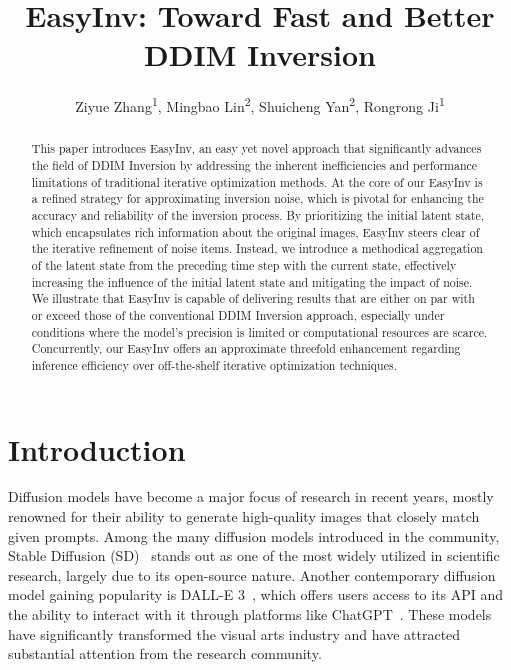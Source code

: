 \documentclass[letterpaper]{article} \usepackage{aaai25}  \usepackage{times}  \usepackage{helvet}  \usepackage{courier}  \usepackage[hyphens]{url}  \usepackage{graphicx} \urlstyle{rm} \def\UrlFont{\rm}  \usepackage{natbib}  \usepackage{caption} \frenchspacing  \setlength{\pdfpagewidth}{8.5in} \setlength{\pdfpageheight}{11in} \usepackage{algorithm}
\begin{document}
\title{EasyInv: Toward Fast and Better DDIM Inversion}
\author {
    Ziyue Zhang\textsuperscript{\rm 1},
    Mingbao Lin\textsuperscript{\rm 2},
    Shuicheng Yan\textsuperscript{\rm 2},
    Rongrong Ji\textsuperscript{\rm 1}
}

\maketitle

\begin{abstract}
This paper introduces EasyInv, an easy yet novel approach that significantly advances the field of DDIM Inversion by addressing the inherent inefficiencies and performance limitations of traditional iterative optimization methods.
At the core of our EasyInv is a refined strategy for approximating inversion noise, which is pivotal for enhancing the accuracy and reliability of the inversion process.
By prioritizing the initial latent state, which encapsulates rich information about the original images, EasyInv steers clear of the iterative refinement of noise items. 
Instead, we introduce a methodical aggregation of the latent state from the preceding time step with the current state, effectively increasing the influence of the initial latent state and mitigating the impact of noise.
We illustrate that EasyInv is capable of delivering results that are either on par with or exceed those of the conventional DDIM Inversion approach, especially under conditions where the model's precision is limited or computational resources are scarce. Concurrently, our EasyInv offers an approximate threefold enhancement regarding inference efficiency over off-the-shelf iterative optimization techniques.
\end{abstract}



\section{Introduction}
\label{Intro}
Diffusion models have become a major focus of research in recent years, mostly renowned for their ability to generate high-quality images that closely match given prompts. Among the many diffusion models introduced in the community, Stable Diffusion (SD)~\cite{rombach2022high} stands out as one of the most widely utilized in scientific research, largely due to its open-source nature. Another contemporary diffusion model gaining popularity is DALL-E 3~\cite{betker2023improving}, which offers users access to its API and the ability to interact with it through platforms like ChatGPT~\cite{chatGPT}.
These models have significantly transformed the visual arts industry and have attracted substantial attention from the research community. 
\end{document}
